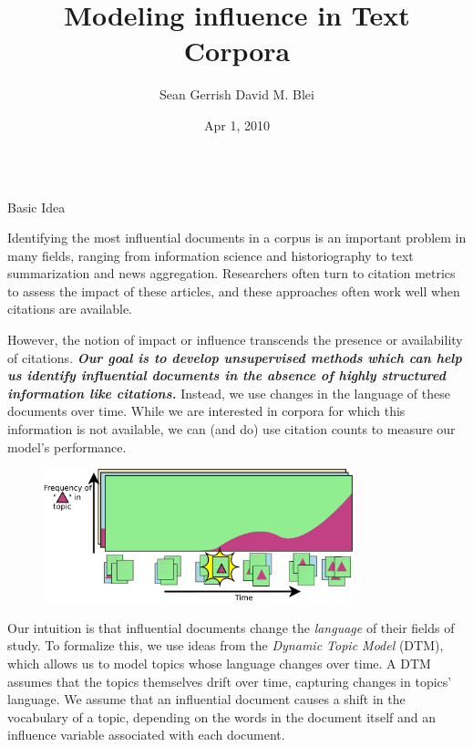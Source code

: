 \documentclass[final,t]{beamer}
\title{\Huge Modeling influence in Text Corpora}
\author[Gerrish et al.]{Sean Gerrish \hspace{2.5in}David M. Blei}
\institute[Princeton University]{Department of Computer Science}
\date[Apr. 1, 2010]{Apr 1, 2010}
\begin{document}
\begin{frame}{} 

  \begin{columns}[t]
    \begin{column}{.34\linewidth}
      \begin{block}{Basic Idea}
        \hspace{-1.6cm} \parbox{.93\textwidth}{
 Identifying the most influential
documents in a corpus is an important problem in many fields, ranging
from information science and historiography to text summarization and
news aggregation. Researchers often turn to citation metrics to assess
the impact of these articles, and these approaches often work well when
citations are available.

\vspace{0.03\textwidth} However, the notion of impact or influence
transcends the presence or availability of citations.
\textbf{\textit{Our goal is to develop unsupervised methods which can
help us identify influential documents in the \textit{absence} of
highly structured information like citations.}  } Instead, we use
changes in the language of these documents over time. While we are
interested in corpora for which this information is not available, we
can (and do) use citation counts to measure our model's performance.

\begin{figure}
  \includegraphics[width=0.8\textwidth]{../figures/influence_intuition.pdf}
\end{figure}

\vspace{0.03\textwidth} Our intuition is that influential documents
change the \textit{language} of their fields of study. To formalize
this, we use ideas from the \textit{Dynamic Topic Model} (DTM), which
allows us to model topics whose language changes over time. A DTM
assumes that the topics themselves drift over time, capturing changes
in topics' language.  We assume that an influential document causes a
shift in the vocabulary of a topic, depending on the words in the
document itself and an influence variable associated with each
document.  }
\end{block}



\end{column}
\end{columns}
\end{frame}
\end{document}
